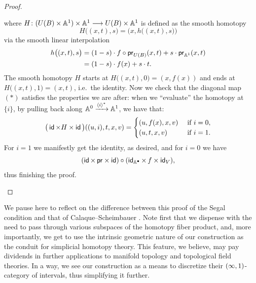 \begin{proof}
\begin{enumerate}
\begin{equation}
        \end{equation}
        where $H\colon (U(B)\times \mathbb A^1) \times \mathbb A^1 \longrightarrow U(B) \times \mathbb A^1$ is defined as the smooth homotopy 
        \begin{equation}
            H\big((x,t),s\big) = \big(x, h\big((x,t),s)\big)
        \end{equation}
        via the smooth linear interpolation
        \begin{align}
        h\big((x,t),s\big) &= (1-s)\cdot f \circ \mathsf{pr}_{U(B)}(x,t) + s \cdot \mathsf{pr}_{\mathbb A^1}(x,t) \\
        &= (1-s)\cdot f(x) + s\cdot t.
        \end{align}
        The smooth homotopy $H$ starts at $H\big((x,t),0\big) = (x,f(x))$ and ends at $H\big((x,t),1\big) = (x,t)$, i.e.\ the identity. Now we check that the diagonal map $(*)$ satisfies the properties we are after: when we ``evaluate'' the homotopy at $\{i\}$, by pulling back along $\mathbb A^0 \xrightarrow{\langle i \rangle^*} \mathbb A^1$, we have that:
        \begin{equation}
            \big(\operatorname{\sf id}\times H \times \operatorname{\sf id}\big)((u,i),t,x,v) = \begin{cases}
                (u,f(x),x,v) & \text{ if } i=0, \\
                (u,t,x,v) & \text{ if } i = 1.
            \end{cases}
        \end{equation}
        For $i=1$ we manifestly get the identity, as desired, and for $i=0$ we have 
        \begin{equation}
        (\operatorname{\sf id} \times \,\mathsf{pr}\times \operatorname{\sf id}) \circ(\operatorname{\sf id}_{\mathbb A^\bullet}\times \,f\times \operatorname{\sf id}_V),
        \end{equation}
        thus finishing the proof.  
    \end{enumerate}
\end{proof}




\begin{observation}
We pause here to reflect on the difference between this proof of the Segal condition and that of Calaque--Scheimbauer \cite[Proposition 5.19]{CS19}. Note first that we dispense with the need to pass through various subspaces of the homotopy fiber product, and, more importantly, we get to use the intrinsic geometric nature of our construction as the conduit for simplicial homotopy theory. This feature, we believe, may pay dividends in further applications to manifold topology and topological field theories. In a way, we see our construction as a means to discretize their $(\operatorname{\infty},1)$-category of intervals, thus simplifying it further.
\end{observation}


